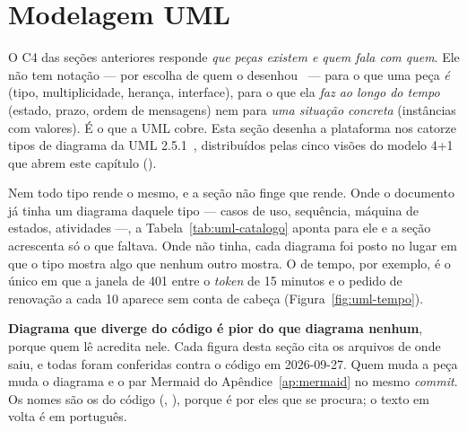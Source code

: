 %
%
\section{Modelagem UML}
\label{sec:uml}

O C4 das seções anteriores responde \emph{que peças existem e quem fala com
quem}. Ele não tem notação --- por escolha de quem o desenhou~\cite{c4model} ---
para o que uma peça \emph{é} (tipo, multiplicidade, herança, interface), para o
que ela \emph{faz ao longo do tempo} (estado, prazo, ordem de mensagens) nem para
\emph{uma situação concreta} (instâncias com valores). É o que a UML cobre. Esta
seção desenha a plataforma nos catorze tipos de diagrama da UML
2.5.1~\cite{omg2017uml}, distribuídos pelas cinco visões do modelo
4+1~\cite{kruchten1995views} que abrem este capítulo ().

Nem todo tipo rende o mesmo, e a seção não finge que rende. Onde o documento já
tinha um diagrama daquele tipo --- casos de uso, sequência, máquina de estados,
atividades ---, a Tabela~\ref{tab:uml-catalogo} aponta para ele e a seção
acrescenta só o que faltava. Onde não tinha, cada diagrama foi posto no lugar em
que o tipo mostra algo que nenhum outro mostra. O de tempo, por exemplo, é o
único em que a janela de 401 entre o \emph{token} de 15 minutos e o pedido de
renovação a cada 10 aparece sem conta de cabeça (Figura~\ref{fig:uml-tempo}).

\begin{regra}
\textbf{Diagrama que diverge do código é pior do que diagrama nenhum}, porque
quem lê acredita nele. Cada figura desta seção cita os arquivos de onde saiu, e
todas foram conferidas contra o código em 2026-09-27. Quem muda a peça muda o
diagrama e o par Mermaid do Apêndice~\ref{ap:mermaid} no mesmo \emph{commit}. Os
nomes são os do código (, ), porque é
por eles que se procura; o texto em volta é em português.
\end{regra}

